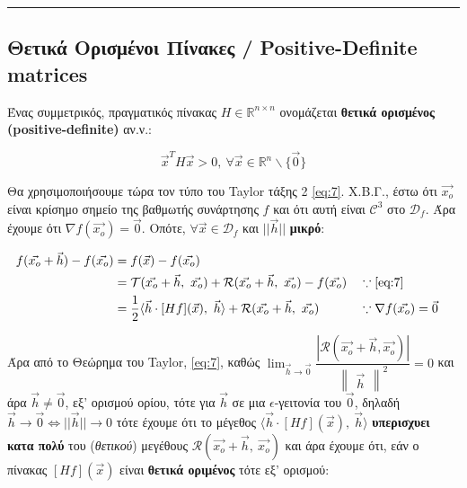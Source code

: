 \documentclass[12pt]{article}
\begin{document}
\begin{center}\rule{0.5\linewidth}{0.5pt}\end{center}    

\subsection{\texorpdfstring{{Θετικά Ορισμένοι Πίνακες / Positive-Definite matrices
}}{Θετικά Ορισμένοι Πίνακες / Positive-Definite matrices}} 

Ένας συμμετρικός, πραγματικός πίνακας \(H \in \mathbb{R}^{n \times n}\)
ονομάζεται \textbf{θετικά ορισμένος (positive-definite)} αν.ν.:

\[
\vec{x}^TH\vec{x} > 0, \  \forall \vec{x} \in \mathbb{R}^n \smallsetminus \{\vec{0}\} \tag{0.4.1} \label{eq:8}
\]

    

    Θα χρησιμοποιήσουμε τώρα τον τύπο του Taylor τάξης 2 \eqref{eq:7}.
Χ.Β.Γ., έστω ότι \(\vec{x_o}\) είναι κρίσημο σημείο της βαθμωτής
συνάρτησης \(f\) και ότι αυτή είναι \(\mathcal{C}^3\) στο
\(\mathcal{D}_f\). Άρα έχουμε ότι \(\nabla f(\vec{x_o})=\vec{0}\).
Οπότε, \(\forall \vec{x} \in \mathcal{D}_f\) και \(||\vec{h}||\)
\textbf{μικρό}:

\begin{align}
f(\vec{x_o}+\vec{h})-f(\vec{x_o}) &= f(\vec{x})-f(\vec{x_o}) \nonumber \\ \nonumber
&= \mathcal{T}(\vec{x_o}+\vec{h}, \ \vec{x_o})+\mathcal{R}(\vec{x_o}+\vec{h}, \ \vec{x_o})-f(\vec{x_o}) && \because \eqref{eq:7} \\ \nonumber
&= \frac{1}{2}\langle \vec{h} \cdot [Hf](\vec{x}), \ \vec{h} \rangle + \mathcal{R}(\vec{x_o}+\vec{h}, \ \vec{x_o}) && \because \nabla f(\vec{x_o})=\vec{0} 
\end{align}

Άρα από το Θεώρημα του Taylor, \eqref{eq:7}, καθώς
\(\lim_{\vec{h}\to\vec{0}}\dfrac{|\mathcal{R}(\vec{x_o}+\vec{h},\vec{x_o})|}{\begin{Vmatrix} \vec{h} \end{Vmatrix}^2}=0\)
και άρα \(\vec{h} \neq \vec{0}\), εξ' ορισμού ορίου, τότε για
\(\vec{h}\) σε μια \(\epsilon\)-γειτονία του \(\vec{0}\), δηλαδή
\(\vec{h} \to \vec{0} \Leftrightarrow ||\vec{h}|| \to 0\) τότε έχουμε
ότι το μέγεθος
\(\langle \vec{h} \cdot [Hf](\vec{x}), \ \vec{h} \rangle\)
\textbf{υπερισχυει κατα πολύ} του (\emph{θετικού}) μεγέθους
\(\mathcal{R}(\vec{x_o}+\vec{h}, \ \vec{x_o})\) και άρα έχουμε ότι, εάν
ο πίνακας \([Hf](\vec{x})\) είναι \textbf{θετικά οριμένος} τότε εξ'
ορισμού:
\end{document}

